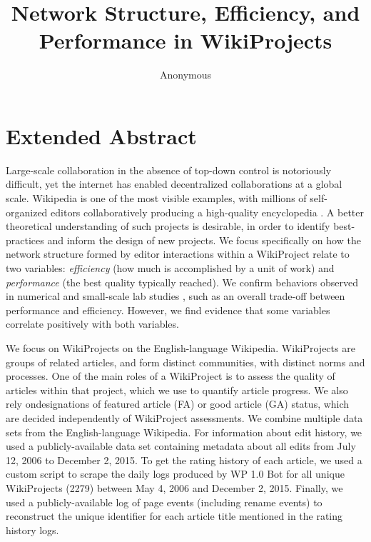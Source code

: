 \documentclass[a4paper,12pt]{article}
\title{Network Structure, Efficiency, and Performance in WikiProjects}
\author{Anonymous}
\date{} %
\newcommand{\+}{\phantom{-}}
\begin{document}
\maketitle

\section*{Extended Abstract}

Large-scale collaboration in the absence of top-down control is notoriously
difficult\cite{freeman_tyranny_1972},
yet the internet has enabled decentralized collaborations at a global scale.
Wikipedia is one of the most visible examples,
with millions of self-organized editors collaboratively producing
a high-quality encyclopedia \cite{giles_internet_2005}.
A better theoretical understanding of such projects is desirable,
in order to identify best-practices and inform the design of new projects.
We focus specifically on how the network structure formed
by editor interactions within a WikiProject relate to
two variables:
{\em efficiency} (how much is accomplished by a unit of work)
and {\em performance} (the best quality typically reached).
We confirm behaviors observed in numerical and small-scale lab studies
\cite{kearns_experiments_2012,golub_naive_2010,mason_propagation_2008},
such as an overall trade-off between performance and efficiency.
However, we find evidence that some variables correlate positively with both variables.

We focus on WikiProjects on the English-language Wikipedia.
WikiProjects are groups of related articles,
and form distinct communities, with distinct norms and processes.
One of the main roles of a WikiProject is to assess the quality of articles
within that project, which we use to quantify article progress.
We also rely ondesignations of featured article (FA) or good article (GA) status,
which are decided independently of WikiProject assessments.
We combine multiple data sets from the English-language Wikipedia.
For information about edit history, we used a publicly-available data set containing
metadata about all edits from July 12, 2006 to December 2, 2015.
To get the rating history of each article,
we used a custom script to scrape the daily logs produced by WP 1.0 Bot for
all unique WikiProjects (2279)
between May 4, 2006 and December 2, 2015.
Finally, we used a publicly-available log of page events (including rename events)
to reconstruct the unique identifier for each article title mentioned in
the rating history logs.
\end{document}
